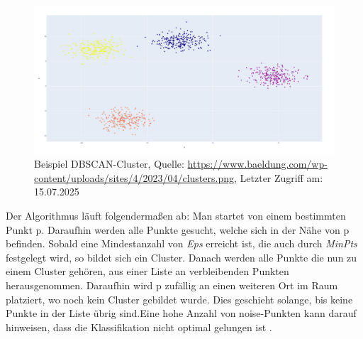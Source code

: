 \documentclass[a4paper,12pt]{article}
\begin{document}
	\begin{figure}[H]
		\centering
		\includegraphics[width=0.9\linewidth]{Bilder/screenshot015}
		\caption{Beispiel DBSCAN-Cluster, Quelle: \url{https://www.baeldung.com/wp-content/uploads/sites/4/2023/04/clusters.png}, Letzter Zugriff am: 15.07.2025}
		\label{fig:screenshot015}
	\end{figure}
	Der Algorithmus läuft folgendermaßen ab:
	Man startet von einem bestimmten Punkt p. Daraufhin werden alle Punkte gesucht, welche sich in der Nähe von p befinden. Sobald eine Mindestanzahl von \textit{Eps} erreicht ist, die auch durch \textit{MinPts} festgelegt wird, so bildet sich ein Cluster. Danach werden alle Punkte die nun zu einem Cluster gehören, aus einer Liste an verbleibenden Punkten herausgenommen. Daraufhin wird p zufällig an einen weiteren Ort im Raum platziert, wo noch kein Cluster gebildet wurde. Dies geschieht solange, bis keine Punkte in der Liste übrig sind.Eine hohe Anzahl von \gls{noise}-Punkten kann darauf hinweisen, dass die Klassifikation nicht optimal gelungen ist \cite{ester1996dbscan}. 
	
\end{document}
